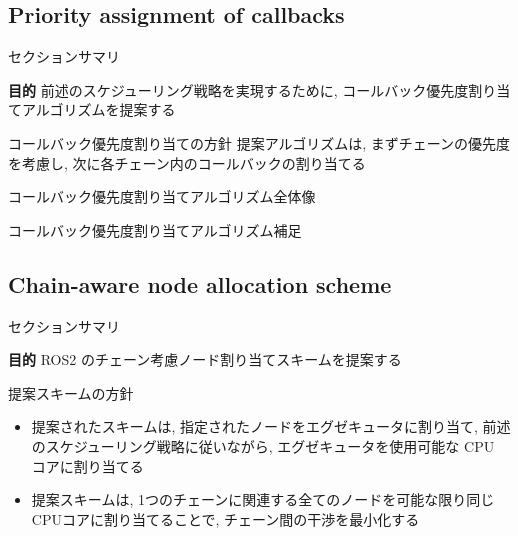 \subsection{Priority assignment of callbacks}
\label{ssec: priority assignment of callbacks}

\begin{frame}{セクションサマリ}
    \begin{itembox}[l]{\textbf{目的}}
        前述のスケジューリング戦略を実現するために, コールバック優先度割り当てアルゴリズムを提案する
    \end{itembox}
\end{frame}

\begin{frame}{コールバック優先度割り当ての方針}
    提案アルゴリズムは, まずチェーンの優先度を考慮し, 次に各チェーン内のコールバックの割り当てる
\end{frame}

\begin{frame}{コールバック優先度割り当てアルゴリズム全体像}
\end{frame}

\begin{frame}{コールバック優先度割り当てアルゴリズム補足}
\end{frame}


\subsection{Chain-aware node allocation scheme}
\label{ssec: chain-aware node allocation scheme}

\begin{frame}{セクションサマリ}
    \begin{itembox}[l]{\textbf{目的}}
        ROS2 のチェーン考慮ノード割り当てスキームを提案する
    \end{itembox}
\end{frame}

\begin{frame}{提案スキームの方針}
    \begin{itemize}
        \item 提案されたスキームは, 指定されたノードをエグゼキュータに割り当て, 前述のスケジューリング戦略に従いながら, エグゼキュータを使用可能な CPU コアに割り当てる
        \item 提案スキームは, 1つのチェーンに関連する全てのノードを可能な限り同じCPUコアに割り当てることで, チェーン間の干渉を最小化する
    \end{itemize}
\end{frame}


